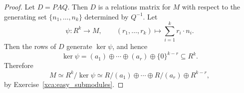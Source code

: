 \begin{proof}
Let $D=PAQ$. Then $D$ is a relations matrix for $M$ with respect to the
generating set $\{n_1,\dots,n_k\}$ determined by $Q^{-1}$. Let
\[
\psi\colon R^k\to M,\qquad
(r_1,\dots,r_k)\mapsto\sum_{i=1}^k r_i\cdot n_i.
\]
Then the rows of $D$ generate $\ker\psi$, and hence
\[
\ker\psi
=
(a_1)\oplus\cdots\oplus(a_r)\oplus\{0\}^{k-r}
\subseteq R^k.
\]
Therefore
\[
M\simeq R^k/\ker\psi
\simeq
R/(a_1)\oplus\cdots\oplus R/(a_r)\oplus R^{k-r},
\]
by Exercise~\ref{xca:easy_submodules}.
\end{proof}


